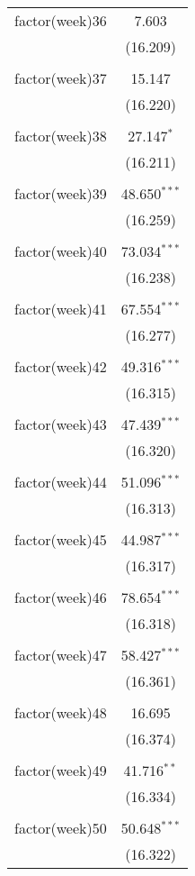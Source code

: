 \documentclass{article}
\begin{document}
\begin{table}[!htbp]
\begin{tabular}{@{\extracolsep{5pt}}lc}
 factor(week)36 & 7.603 \\ 
  & (16.209) \\ 
  & \\ 
 factor(week)37 & 15.147 \\ 
  & (16.220) \\ 
  & \\ 
 factor(week)38 & 27.147$^{*}$ \\ 
  & (16.211) \\ 
  & \\ 
 factor(week)39 & 48.650$^{***}$ \\ 
  & (16.259) \\ 
  & \\ 
 factor(week)40 & 73.034$^{***}$ \\ 
  & (16.238) \\ 
  & \\ 
 factor(week)41 & 67.554$^{***}$ \\ 
  & (16.277) \\ 
  & \\ 
 factor(week)42 & 49.316$^{***}$ \\ 
  & (16.315) \\ 
  & \\ 
 factor(week)43 & 47.439$^{***}$ \\ 
  & (16.320) \\ 
  & \\ 
 factor(week)44 & 51.096$^{***}$ \\ 
  & (16.313) \\ 
  & \\ 
 factor(week)45 & 44.987$^{***}$ \\ 
  & (16.317) \\ 
  & \\ 
 factor(week)46 & 78.654$^{***}$ \\ 
  & (16.318) \\ 
  & \\ 
 factor(week)47 & 58.427$^{***}$ \\ 
  & (16.361) \\ 
  & \\ 
 factor(week)48 & 16.695 \\ 
  & (16.374) \\ 
  & \\ 
 factor(week)49 & 41.716$^{**}$ \\ 
  & (16.334) \\ 
  & \\ 
 factor(week)50 & 50.648$^{***}$ \\ 
  & (16.322) \\ 

\end{tabular}
\end{table}
\end{document}
